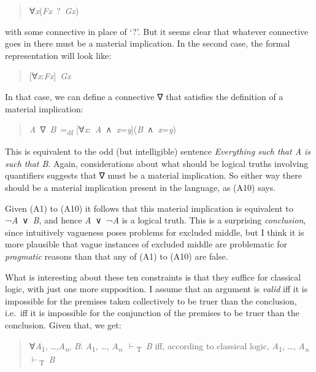 \documentclass[
  11pt,
  letterpaper,
  DIV=11,
  numbers=noendperiod,
  twoside]{scrartcl}
\begin{document}
\begin{quote}
∀\emph{x}(\emph{Fx}~?~\emph{Gx})
\end{quote}

with some connective in place of `?'. But it seems clear that whatever
connective goes in there must be a material implication. In the second
case, the formal representation will look like:

\begin{quote}
{[}∀\emph{x}:\emph{Fx}{]}~\emph{Gx}
\end{quote}

In that case, we can define a connective ∇ that satisfies the definition
of a material implication:

\begin{quote}
\emph{A}~∇~\emph{B}~=\textsubscript{df}
{[}∀\emph{x}:~\emph{A}~∧~\emph{x}=\emph{y}{]}(\emph{B}~∧~\emph{x}=\emph{y})
\end{quote}

This is equivalent to the odd (but intelligible) sentence
\emph{Everything such that A is such that B}. Again, considerations
about what should be logical truths involving quantifiers suggests that
∇ must be a material implication. So either way there should be a
material implication present in the language, as (A10) says.

Given (A1) to (A10) it follows that this material implication is
equivalent to ¬\emph{A}~∨~\emph{B}, and hence \emph{A}~∨~¬\emph{A} is a
logical truth. This is a surprising \emph{conclusion}, since intuitively
vagueness poses problems for excluded middle, but I think it is more
plausible that vague instances of excluded middle are problematic for
\emph{pragmatic} reasons than that any of (A1) to (A10) are false.

What is interesting about these ten constraints is that they suffice for
classical logic, with just one more supposition. I assume that an
argument is \emph{valid} iff it is impossible for the premises taken
collectively to be truer than the conclusion, i.e.~iff it is impossible
for the conjunction of the premises to be truer than the conclusion.
Given that, we get:

\begin{quote}
∀\emph{A}\textsubscript{1}, \ldots,\emph{A\textsubscript{n}}, \emph{B}:
\emph{A}\textsubscript{1}, \ldots,
\emph{A\textsubscript{n}}~\(\vdash\)\textsubscript{T}~\emph{B} iff,
according to classical logic, \emph{A}\textsubscript{1}, \ldots,
\emph{A\textsubscript{n}}~\(\vdash\)\textsubscript{T}~\emph{B}
\end{quote}
\end{document}

